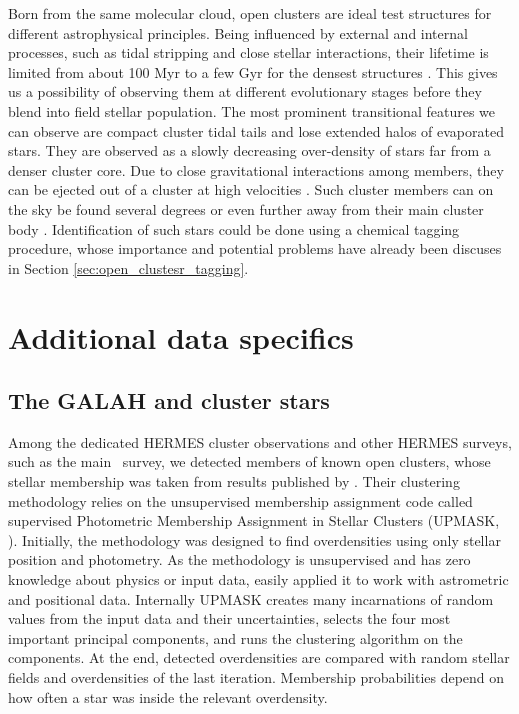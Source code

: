 Born from the same molecular cloud, open clusters are ideal test structures for different astrophysical principles. Being influenced by external and internal processes, such as tidal stripping and close stellar interactions, their lifetime is limited from about 100 Myr to a few Gyr for the densest structures \cite{1998A&A...337..363P, 2013MNRAS.434.2509M}. This gives us a possibility of observing them at different evolutionary stages \cite{2006BASI...34..153C, 2007A&A...468..139P} before they blend \cite{2001A&A...366..827B} into field stellar population. The most prominent transitional features we can observe are compact cluster tidal tails \cite{2019AA...627A...4R, 2019AJ....157..115Y, 2019AA...621L...3M, 2019arXiv191206657Z} and lose extended halos of evaporated stars. They are observed as a slowly decreasing over-density \cite{2002A&A...385..471C, 2004A&A...427..485B, 2019AA...627A.119C} of stars far from a denser cluster core. Due to close gravitational interactions among members, they can be ejected out of a cluster at high velocities \cite{2009MNRAS.396..570G, 2010MNRAS.402..105G, 2017MNRAS.470.3049R}. Such cluster members can on the sky be found several degrees or even further away from their main cluster body \cite{2007MNRAS.376L..29G, 2018MNRAS.473.4612K, 2019ApJ...884....6M}. Identification of such stars could be done using a chemical tagging procedure, whose importance and potential problems have already been discuses in Section \ref{sec:open_clustesr_tagging}. 

\section{Additional data specifics}
\label{sec:data_clusters}

\subsection{The GALAH and cluster stars}
\label{sec:galah_clusters}
Among the dedicated HERMES cluster observations and other HERMES surveys, such as the main \Gh\ survey, we detected members of known open clusters, whose stellar membership was taken from results published by \citet{2018A&A...618A..93C}. Their clustering methodology relies on the unsupervised membership assignment code called supervised Photometric Membership Assignment in Stellar Clusters (UPMASK, \cite{2014A&A...561A..57K}). Initially, the methodology was designed to find overdensities using only stellar position and photometry. As the methodology is unsupervised and has zero knowledge about physics or input data, \citet{2014A&A...561A..57K} easily applied it to work with astrometric and positional data. Internally UPMASK creates many incarnations of random values from the input data and their uncertainties, selects the four most important principal components, and runs the clustering algorithm on the components. At the end, detected overdensities are compared with random stellar fields and overdensities of the last iteration. Membership probabilities depend on how often a star was inside the relevant overdensity.

